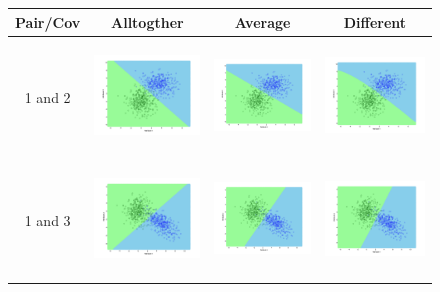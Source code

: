 \documentclass[a4paper]{article}
\begin{document}
			\begin{figure}
			\begin{tabular}{|c|c|c|c|}
				\hline
				Pair/Cov &  Alltogther & Average & Different	\\
				\hline
				1 and
				2&\includegraphics[width=40mm,height=30mm]{naivebayes/over/pair/12/all_cov.png}&\includegraphics[width=40mm,height=30mm]{naivebayes/over/pair/12/avg_cov.png}
				&\includegraphics[width=40mm,height=30mm]{naivebayes/over/pair/12/diff_cov.png}\\
				\hline
				1 and
				3&\includegraphics[width=40mm,height=30mm]{naivebayes/over/pair/13/all_cov.png}&\includegraphics[width=40mm,height=30mm]{naivebayes/over/pair/13/avg_cov.png}
				&\includegraphics[width=40mm,height=30mm]{naivebayes/over/pair/13/diff_cov.png}\\

\end{tabular}
\end{figure}
\end{document}
